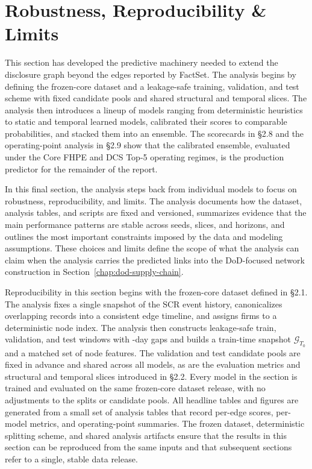 \section{Robustness, Reproducibility \& Limits}

This section has developed the predictive machinery needed to extend the disclosure graph beyond the edges reported by FactSet. The analysis begins by defining the frozen-core dataset and a leakage-safe training, validation, and test scheme with fixed candidate pools and shared structural and temporal slices. The analysis then introduces a lineup of models ranging from deterministic heuristics to static and temporal learned models, calibrated their scores to comparable probabilities, and stacked them into an ensemble. The scorecards in \S2.8 and the operating-point analysis in \S2.9 show that the calibrated ensemble, evaluated under the Core FHPE and DCS Top-5 operating regimes, is the production predictor for the remainder of the report.

In this final section, the analysis steps back from individual models to focus on robustness, reproducibility, and limits. The analysis documents how the dataset, analysis tables, and scripts are fixed and versioned, summarizes evidence that the main performance patterns are stable across seeds, slices, and horizons, and outlines the most important constraints imposed by the data and modeling assumptions. These choices and limits define the scope of what the analysis can claim when the analysis carries the predicted links into the DoD-focused network construction in Section~\ref{chap:dod-supply-chain}.

Reproducibility in this section begins with the frozen-core dataset defined in \S2.1. The analysis fixes a single snapshot of the SCR event history, canonicalizes overlapping records into a consistent edge timeline, and assigns firms to a deterministic node index. The analysis then constructs leakage-safe train, validation, and test windows with \InterSplitGap-day gaps and builds a train-time snapshot \(\mathcal{G}_{T_0}\) and a matched set of node features. The validation and test candidate pools are fixed in advance and shared across all models, as are the evaluation metrics and structural and temporal slices introduced in \S2.2. Every model in the section is trained and evaluated on the same frozen-core dataset release, with no adjustments to the splits or candidate pools. All headline tables and figures are generated from a small set of analysis tables that record per-edge scores, per-model metrics, and operating-point summaries. The frozen dataset, deterministic splitting scheme, and shared analysis artifacts ensure that the results in this section can be reproduced from the same inputs and that subsequent sections refer to a single, stable data release.

